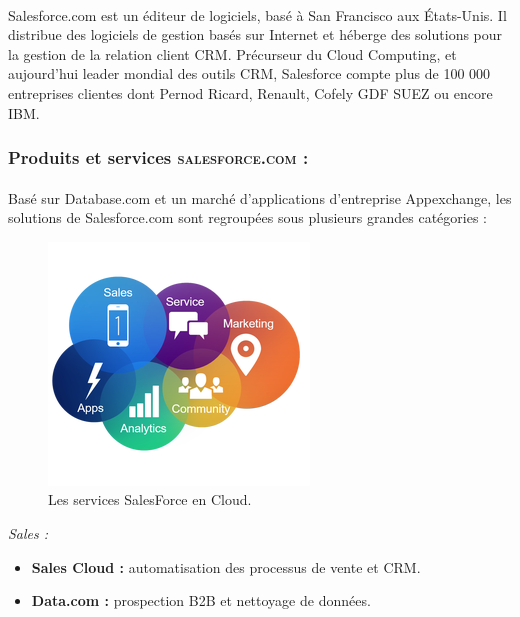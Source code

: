 \documentclass[a4paper, 12pt]{report}
\begin{document}
\begin{itemize}
\paragraph{}
Salesforce.com est un éditeur de logiciels, basé à San Francisco aux États-Unis. Il distribue des logiciels de gestion basés sur Internet et héberge des solutions pour la gestion de la relation client CRM.
Précurseur du Cloud Computing, et aujourd'hui leader mondial des outils CRM, Salesforce compte plus de 100 000 entreprises clientes dont Pernod Ricard, Renault, Cofely GDF SUEZ ou encore IBM.

\subsubsection{Produits et services \textsc{salesforce.com} : }

 \paragraph{}
Basé sur Database.com et un marché d'applications d'entreprise Appexchange, les solutions de Salesforce.com sont regroupées sous plusieurs grandes catégories : 

\begin{figure}[H]
\centering
\includegraphics[scale=2]{clouds.png}
\caption{Les services SalesForce en Cloud.}
\end{figure}

\begin{description}

\item{\textit{Sales : }}

	\begin{itemize}
		\item \textbf{Sales Cloud : } automatisation des processus de vente et CRM.
		\item \textbf{Data.com : } prospection B2B et nettoyage de données.
	\end{itemize}
	

\end{description}
\end{itemize}
\end{document}
